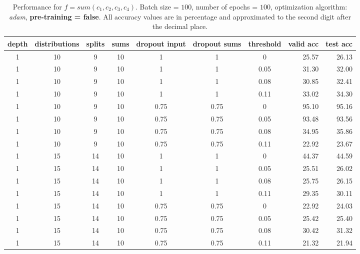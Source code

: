 \begin{table}[H]
  \centering
  \caption{Performance for $\mathit{f} = sum(\mathit{c}_1,\mathit{c}_2,\mathit{c}_3,\mathit{c}_4)$. Batch size = $100$, number of epochs = $100$, optimization algorithm: \textit{adam}, \textbf{pre-training = false}. All accuracy values are in percentage and approximated to the second digit after the decimal place.}
  \label{tab:results-quadruples-clno}
  \scriptsize
  \begin{tabular}{cccccccrr}
    \toprule
    depth		& distributions 	& splits 		& sums 				& dropout input 		& dropout sums 			& threshold				& valid acc 			& test acc\\
    \midrule
	1	      	& 10     			& 9      		& 10     			& 1     				& 1      				& 0  					& 25.57    				& 26.13\\ 
	1      		& 10     			& 9      		& 10    			& 1      				& 1  					& 0.05    				& 31.30    				& 32.00\\ 
	1	      	& 10     			& 9      		& 10     			& 1      				& 1  					& 0.08    				& 30.85    				& 32.41\\ 
	1   	   	& 10     			& 9      		& 10     			& 1      				& 1  					& 0.11    				& 33.02    				& 34.30\\ 
	1   	   	& 10     			& 9      		& 10 				& 0.75    				& 0.75    				& 0  					& 95.10    				& 95.16\\ 
	1      		& 10     			& 9      		& 10 				& 0.75    				& 0.75    				& 0.05    				& 93.48    				& 93.56\\ 
	1      		& 10     			& 9      		& 10 				& 0.75    				& 0.75    				& 0.08    				& 34.95    				& 35.86\\ 
	1      		& 10     			& 9      		& 10 				& 0.75    				& 0.75    				& 0.11    				& 22.92    				& 23.67\\ 
	
	1      		& 15     			& 14     		& 10     			& 1      				& 1      				& 0  					& 44.37    				& 44.59\\ 
	1      		& 15     			& 14     		& 10     			& 1      				& 1  					& 0.05    				& 25.51    				& 26.02\\ 
	1      		& 15     			& 14     		& 10     			& 1      				& 1  					& 0.08    				& 25.75    				& 26.15\\
	1      		& 15     			& 14     		& 10     			& 1      				& 1  					& 0.11    				& 29.35    				& 30.11\\ 	
	1      		& 15     			& 14     		& 10 				& 0.75    				& 0.75    				& 0						& 22.92    				& 24.03\\ 
	1      		& 15     			& 14     		& 10      			& 0.75    				& 0.75    				& 0.05    				& 25.42    				& 25.40\\ 
	1      		& 15     			& 14     		& 10 				& 0.75    				& 0.75    				& 0.08    				& 30.42    				& 31.32\\ 
	1      		& 15     			& 14     		& 10 				& 0.75    				& 0.75    				& 0.11					& 21.32    				& 21.94\\
	

\end{tabular}
\end{table}
